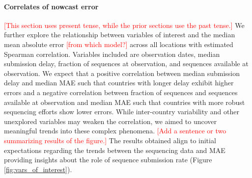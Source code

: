 \documentclass[11pt,oneside,letterpaper]{article}
\def\jhc#1{\textcolor{red}{[#1]}}
\begin{document}
\paragraph{Correlates of nowcast error}
\jhc{This section uses present tense, while the prior sections use the past tense.}
We further explore the relationship between variables of interest and the median mean absolute error \jhc{from which model?} across all locations with estimated Spearman correlation.
Variables included are observation dates, median submission delay, fraction of sequences at observation, and sequences available at observation.
We expect that a positive correlation between median submission delay and median MAE such that countries with longer delay exhibit higher errors and a negative correlation between fraction of sequences and sequences available at observation and median MAE such that countries with more robust sequencing efforts show lower errors.
While inter-country variability and other unexplored variables may weaken the correlation, we aimed to uncover meaningful trends into these complex phenomena.
\jhc{Add a sentence or two summarizing results of the figure.}
The results obtained align to initial expectations regarding the trends between the sequencing data and MAE providing insights about the role of sequence submission rate (Figure \ref{fig:vars_of_interest}).
\end{document}
